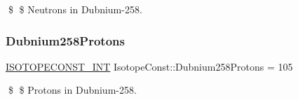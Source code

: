 \$ \$ Neutrons in Dubnium-\/258. \mbox{\label{group___isotope_const-_dubnium-_db258_ga01c90744558f27f2651ca7bba8cad737}} 
\subsubsection{\texorpdfstring{Dubnium258\+Protons}{Dubnium258Protons}}
{\footnotesize\ttfamily \mbox{\hyperlink{group___isotope_const-_macros_ga5f18360b3e99483a35c32d789e62621c}{I\+S\+O\+T\+O\+P\+E\+C\+O\+N\+S\+T\+\_\+\+I\+NT}} Isotope\+Const\+::\+Dubnium258\+Protons = 105}

\$ \$ Protons in Dubnium-\/258. 